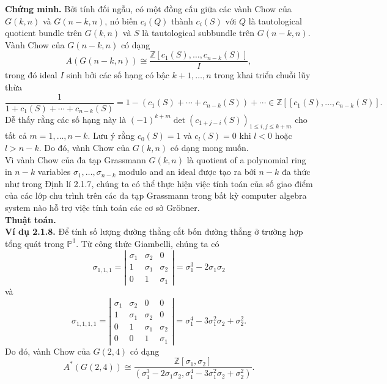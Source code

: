 \documentclass[11pt,a4paper]{book}
\begin{document}
\textbf{Chứng minh.}
Bởi tính đối ngẫu, có một đồng cấu giữa các vành Chow của \( G(k, n) \) và \( G(n-k, n) \), nó biến \( c_i(Q) \) thành \( c_i(S) \) với \( Q \) là tautological quotient bundle trên \( G(k, n) \) và \( S \) là tautological subbundle trên \( G(n-k, n) \). Vành Chow của \( G(n-k, n) \) có dạng
\[
A(G(n-k, n)) \cong \frac{\mathbb{Z}\left[c_1(S), \ldots, c_{n-k}(S)\right]}{I},
\]
trong đó ideal \( I \) sinh bởi các số hạng có bậc \( k+1, \ldots, n \) trong khai triển chuỗi lũy thừa
\[
\frac{1}{1+c_1(S)+\cdots+c_{n-k}(S)}=1-\left(c_1(S)+\cdots+c_{n-k}(S)\right)+\cdots \in \mathbb{Z}\left[\left[c_1(S), \ldots, c_{n-k}(S)\right].\right.
\]
Dễ thấy rằng các số hạng này là \( (-1)^{k+m} \operatorname{det}\left(c_{1+j-i}(S)\right)_{1 \leq i, j \leq k+m} \) cho tất cả \( m=1, \ldots, n-k \). Lưu ý rằng \( c_0(S)=1 \) và \( c_l(S)=0 \) khi \( l<0 \) hoặc \( l>n-k \). Do đó, vành Chow của \( G(k, n) \) có dạng mong muốn.\\
Vì vành Chow của đa tạp Grassmann \( G(k, n) \) là quotient of a polynomial ring in \( n-k \) variables \( \sigma_1, \ldots, \sigma_{n-k} \) modulo and an ideal được tạo ra bởi \( n-k \) đa thức như trong Định lí 2.1.7, chúng ta có thể thực hiện việc tính toán của số giao điểm của các lớp chu trình trên các đa tạp Grassmann trong bất kỳ computer algebra system nào hỗ trợ việc tính toán các cơ sở Gröbner.\\
\textbf{Thuật toán.}\\
\textbf{Ví dụ 2.1.8.}
Để tính số lượng đường thẳng cắt bốn đường thẳng ở trường hợp tổng quát trong \( \mathbb{P}^3 \). Từ công thức Giambelli, chúng ta có
\[
\sigma_{1,1,1}=\left|\begin{array}{ccc}
	\sigma_1 & \sigma_2 & 0 \\
	1 & \sigma_1 & \sigma_2 \\
	0 & 1 & \sigma_1
\end{array}\right|=\sigma_1^3-2 \sigma_1 \sigma_2
\]
và
\[
\sigma_{1,1,1,1}=\left|\begin{array}{cccc}
	\sigma_1 & \sigma_2 & 0 & 0 \\
	1 & \sigma_1 & \sigma_2 & 0 \\
	0 & 1 & \sigma_1 & \sigma_2 \\
	0 & 0 & 1 & \sigma_1
\end{array}\right|=\sigma_1^4-3 \sigma_1^2 \sigma_2+\sigma_2^2.
\]
Do đó, vành Chow của \( G(2,4) \) có dạng
\[
A^*(G(2,4)) \cong \frac{\mathbb{Z}\left[\sigma_1, \sigma_2\right]}{\left(\sigma_1^3-2 \sigma_1 \sigma_2, \sigma_1^4-3 \sigma_1^2 \sigma_2+\sigma_2^2\right)}.
\]
\end{document}
